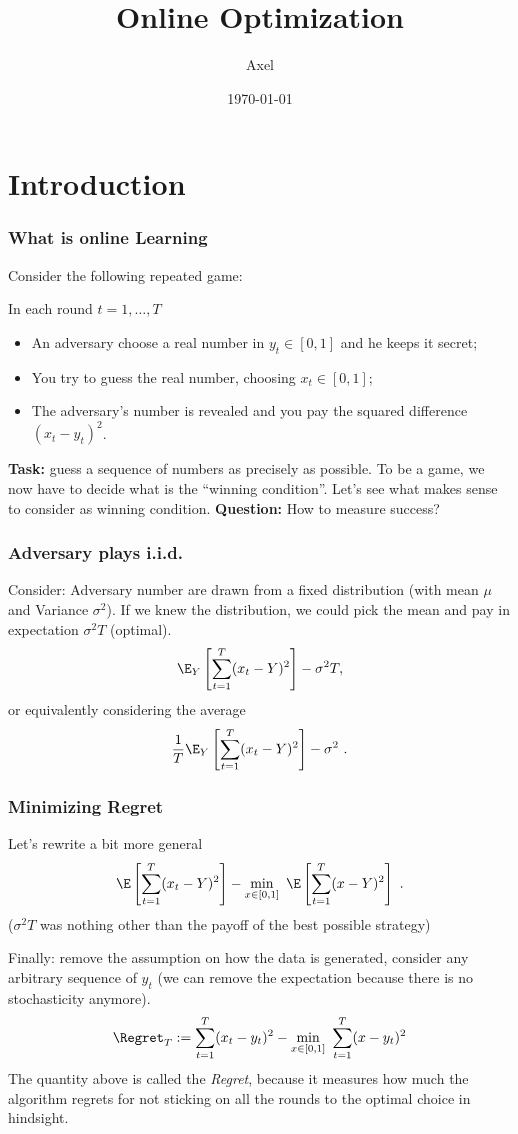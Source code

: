 \documentclass{beamer}
\title{Online Optimization}
\author{Axel}
\date{\today}
\begin{document}
\maketitle
\frame{\tableofcontents[currentsection]}

\section{Introduction}

\begin{frame}
  \frametitle{What is online Learning}
Consider the following repeated game:

In each round $t=1,\dots,T$
\begin{itemize}
  \item An adversary choose a real number in $y_t \in [0,1]$ and he keeps it secret;
  \item You try to guess the real number, choosing $x_t \in [0,1]$;
  \item The adversary's number is revealed and you pay the squared difference ${(x_t-y_t)}^2$.
\end{itemize}
\textbf{Task:} guess a sequence of numbers as precisely as possible.
To be a game, we now have to decide what is the ``winning condition''. Let's see what makes sense to consider as winning condition.
\textbf{Question:} How to measure success?
\end{frame}


\begin{frame}
  \frametitle{Adversary plays i.i.d.}
  Consider: Adversary number are drawn from a fixed distribution (with mean $\mu$ and Variance $\sigma^2$).
  If we knew the distribution, we could pick the mean and pay in expectation $\sigma^2T$ (optimal).
  \begin{equation}
    \label{eq:stoch_regret}
    \E_Y\left[\sum_{t=1}^T (x_t - Y)^2\right] - \sigma^2 T,
  \end{equation}
  or equivalently considering the average
  \begin{equation}
    \label{eq:av_stoch_regret}
    \frac{1}{T}\E_Y\left[\sum_{t=1}^T (x_t - Y)^2\right] - \sigma^2~.
  \end{equation}
\end{frame}


\begin{frame}
  \frametitle{Minimizing Regret}
  Let's rewrite a bit more general
  \[
    \E\left[\sum_{t=1}^T (x_t - Y)^2\right] - \min_{ x \in [0,1]} \ \E\left[\sum_{t=1}^T (x-Y)^2\right]~.
  \]
  ($\sigma^2T$ was nothing other than the payoff of the best possible strategy)

  Finally: remove the assumption on how the data is generated, consider any arbitrary sequence of $y_t$ (we can remove the expectation because there is no stochasticity anymore).
  \[
    \Regret_T:=\sum_{t=1}^T (x_t - y_t)^2 - \min_{x \in [0,1]} \ \sum_{t=1}^T (x - y_t)^2
  \]
  The quantity above is called the \emph{Regret}, because it measures how much the algorithm regrets for not sticking on all the rounds to the optimal choice in hindsight.
\end{frame}
\end{document}
